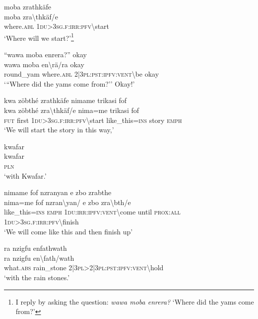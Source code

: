 \ea\label{ex:1:a3465}
moba zrathkäfe\\
\gll moba	zra{\textbackslash}thkäf/e\\
     where.\textsc{abl}	1\textsc{du}>3\textsc{sg}.\textsc{f}:\textsc{irr}:\textsc{pfv}{\textbackslash}start\\
\glt `Where will we start?'\footnote{I reply by asking the question: \textit{wawa moba enrera?} `Where did the yams come from?'}
\z

\ea\label{ex:1:a3466}
``wawa moba enrera?'' okay\\
\gll wawa	moba	en{\textbackslash}rä/ra	okay\\
     round\_yam	where.\textsc{abl}	2|3\textsc{pl}:\textsc{pst}:\textsc{ipfv}:\textsc{vent}{\textbackslash}be	okay\\
\glt `{``}Where did the yams come from?'' Okay!'
\z

\ea\label{ex:1:a3468}
kwa zöbthé zrathkäfe nimame trikasi fof\\
\gll kwa	zöbthé	zra{\textbackslash}thkäf/e	nima=me	trikasi	fof\\
     \textsc{fut}	first	1\textsc{du}>3\textsc{sg}.\textsc{f}:\textsc{irr}:\textsc{pfv}{\textbackslash}start	like\_this=\textsc{ins}	story	\textsc{emph}\\
\glt `We will start the story in this way,'
\z

\ea\label{ex:1:a3469}
kwafar\\
\gll kwafar\\
     \textsc{pln}\\
\glt `with Kwafar.'
\z

\ea\label{ex:1:a3470}
nimame fof nzranyan e zbo zrabthe\\
\gll nima=me	fof	nzran{\textbackslash}yan/	e	zbo	zra{\textbackslash}bth/e\\
     like\_this=\textsc{ins}	\textsc{emph}	1\textsc{du}:\textsc{irr}:\textsc{ipfv}:\textsc{vent}{\textbackslash}come	until	\textsc{prox}:\textsc{all}	1\textsc{du}>3\textsc{sg}.\textsc{f}:\textsc{irr}:\textsc{pfv}{\textbackslash}finish\\
\glt `We will come like this and then finish up'
\z

\ea\label{ex:1:a3471}
ra nzigfu enfathwath\\
\gll ra	nzigfu	en{\textbackslash}fath/wath\\
     what.\textsc{abs}	rain\_stone	2|3\textsc{pl}>2|3\textsc{pl}:\textsc{pst}:\textsc{ipfv}:\textsc{vent}{\textbackslash}hold\\
\glt `with the rain stones.'
\z

